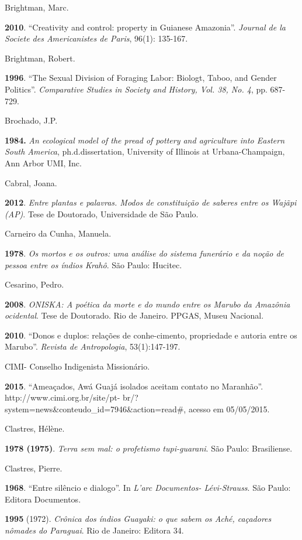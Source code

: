 Brightman, Marc.

\textbf{2010}. ``Creativity and control: property in Guianese
Amazonia''. \emph{Journal de la Societe des Americanistes de Paris},
96(1): 135-167.

Brightman, Robert.

\textbf{1996}. ``The Sexual Division of Foraging Labor: Biologt, Taboo,
and Gender Politics''. \emph{Comparative Studies in Society and History,
Vol. 38, No. 4}, pp. 687-729.

Brochado, J.P.

\textbf{1984.} \emph{An ecological model of the pread of pottery and
agriculture into Eastern South America}, ph.d.dissertation, University
of Illinois at Urbana-Champaign, Ann Arbor UMI, Inc.

Cabral, Joana.

\textbf{2012}. \emph{Entre plantas e palavras. Modos de constituição de
saberes entre os Wajãpi (AP)}. Tese de Doutorado, Universidade de São
Paulo.

Carneiro da Cunha, Manuela.

\textbf{1978}. \emph{Os mortos e os outros: uma análise do sistema
funerário e da noção de pessoa entre os índios Krahô}. São Paulo:
Hucitec.

Cesarino, Pedro.

\textbf{2008}. \emph{ONISKA: A poética da morte e do mundo entre os
Marubo da Amazônia ocidental}. Tese de Doutorado. Rio de Janeiro. PPGAS,
Museu Nacional.

\textbf{2010}. ``Donos e duplos: relações de conhe-cimento, propriedade
e autoria entre os Marubo''. \emph{Revista de Antropologia},
53(1):147-197.

CIMI- Conselho Indigenista Missionário.

\textbf{2015}. ``Ameaçados, Awá Guajá isolados aceitam contato no
Maranhão''. http://www.cimi.org.br/site/pt-
br/?system=news\&conteudo\_id=7946\&action=read\#, acesso em 05/05/2015.

Clastres, Hélène.

\textbf{1978 (1975)}. \emph{Terra sem mal: o profetismo tupi-guarani}.
São Paulo: Brasiliense.

Clastres, Pierre.

\textbf{1968}. ``Entre silêncio e dialogo''. In \emph{L'arc Documentos-
Lévi-Strauss}. São Paulo: Editora Documentos.

\textbf{1995} (1972). \emph{Crônica dos índios Guayaki: o que sabem os
Aché, caçadores nômades do Paraguai}. Rio de Janeiro: Editora 34.

